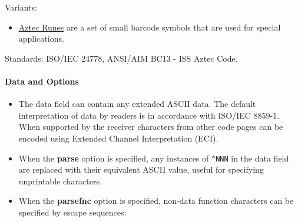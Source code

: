Variants:

\begin{itemize}
\tightlist
\item
  \protect\hyperlink{aztec-runes}{Aztec Runes} are a set of small
  barcode symbols that are used for special applications.
\end{itemize}

Standards: ISO/IEC 24778, ANSI/AIM BC13 - ISS Aztec Code.

\hypertarget{data-and-options-7}{%
\paragraph{Data and Options}\label{data-and-options-7}}

\begin{itemize}
\tightlist
\item
  The data field can contain any extended ASCII data. The default
  interpretation of data by readers is in accordance with ISO/IEC
  8859-1. When supported by the receiver characters from other code
  pages can be encoded using Extended Channel Interpretation (ECI).
\item
  When the \textbf{parse} option is specified, any instances of
  \texttt{\^{}NNN} in the data field are replaced with their equivalent
  ASCII value, useful for specifying unprintable characters.
\item
  When the \textbf{parsefnc} option is specified, non-data function
  characters can be specified by escape sequences:


\end{itemize}
